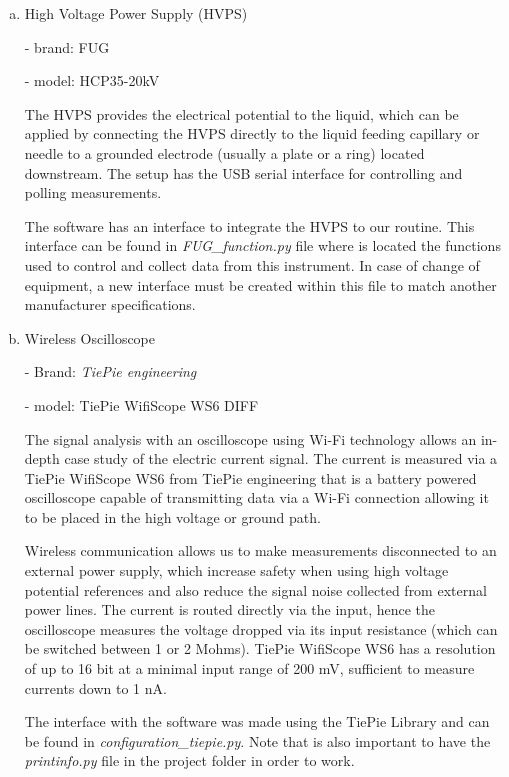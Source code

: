\begin{enumerate}[a)]

  \item High Voltage Power Supply (HVPS)
  
     - brand: FUG
    
     - model: HCP35-20kV
    
    The HVPS provides the electrical potential to the liquid, which can be applied by connecting the HVPS directly to the liquid feeding capillary or needle to a grounded electrode (usually a plate or a ring) located downstream.\cite{Monica}
    The setup has the USB serial interface for controlling and polling measurements.
    
    The software has an interface to integrate the HVPS to our routine. This interface can be found in \emph{FUG\_function.py} file where is located the functions used to control and collect data from this instrument.
    In case of change of equipment, a new interface must be created within this file to match another manufacturer specifications.

  \item Wireless Oscilloscope
  
     - Brand: \emph{TiePie engineering}

     - model: TiePie WifiScope WS6 DIFF
    
    The signal analysis with an oscilloscope using Wi-Fi technology allows an in-depth case study of the electric current signal.
    The current is measured via a TiePie WifiScope WS6 from TiePie engineering that is a battery powered oscilloscope capable of transmitting data via a Wi-Fi connection allowing it to be placed in the high voltage or ground path.
    
    Wireless communication allows us to make measurements disconnected to an external power supply, which increase safety when using high voltage potential references and also reduce the signal noise collected from external power lines.
    The current is routed directly via the input, hence the oscilloscope measures the voltage dropped via its input resistance (which can be switched between 1 or 2 Mohms).
    TiePie WifiScope WS6 has a resolution of up to 16 bit at a minimal input range of 200 mV, sufficient to measure currents down to 1 nA.

    The interface with the software was made using the TiePie Library\cite{TiePieLib} and can be found in \emph{configuration\_tiepie.py}. Note that is also important to have the \emph{printinfo.py} file in the project folder in order to work.


\end{enumerate}
